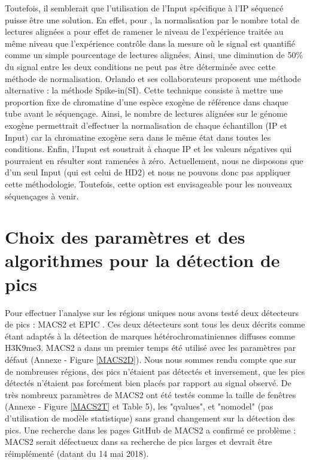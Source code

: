 \documentclass[a4paper,12pt,times]{report}
\begin{document}
  
  \bigskip
  Toutefois, il semblerait que l'utilisation de l'Input spécifique à l'IP séquencé puisse être une solution. En effet, pour \cite{norma}, la normalisation par le nombre total de lectures alignées a pour effet de ramener le niveau de l'expérience traitée au même niveau que l'expérience contrôle dans la mesure où le signal est quantifié comme un simple pourcentage de lectures alignées. Ainsi, une diminution de 50\% du signal entre les deux conditions ne peut pas être déterminée avec cette méthode de normalisation.  
  Orlando et ses collaborateurs proposent une méthode alternative : la méthode Spike-in(SI). Cette technique consiste à mettre une proportion fixe de chromatine d'une espèce exogène de référence dans chaque tube avant le séquençage. Ainsi, le nombre de lectures alignées sur le génome exogène permettrait  d'effectuer la normalisation de chaque échantillon (IP et Input) car la chromatine exogène sera dans le même état dans toutes les conditions. Enfin, l'Input est soustrait à chaque IP et les valeurs négatives qui pourraient en résulter sont ramenées à zéro.  
\newline Actuellement, nous ne disposons que d'un seul Input (qui est celui de HD2) et nous ne pouvons donc pas appliquer cette méthodologie.  Toutefois, cette option est envisageable pour les nouveaux séquençages à venir.
 \section{Choix des paramètres et des algorithmes pour la détection de pics}
 Pour effectuer l'analyse sur les régions uniques nous avons testé deux détecteurs de pics : MACS2 \cite{MACS} et EPIC \cite{SICER}.
 Ces deux détecteurs sont tous les deux décrits comme étant adaptés à la détection de marques hétérochromatiniennes diffuses comme H3K9me3.
\newline
 MACS2 a dans un premier temps été utilisé avec les paramètres par défaut (Annexe - Figure \ref{MACS2D}).  Nous nous sommes rendu compte que sur de nombreuses régions, des pics n'étaient pas détectés et inversement,  que les pics détectés n'étaient pas forcément bien placés par rapport au signal observé.  De très nombreux paramètres de MACS2 ont été testés comme la taille de fenêtres (Annexe - Figure \ref{MACS2T} et Table 5), les "qvalues", et "nomodel" (pas d'utilisation de modèle statistique) sans grand changement sur la détection des pics. Une recherche dans les pages GitHub de MACS2 a confirmé ce problème : MACS2 serait défectueux dans sa recherche de pics larges et devrait être réimplémenté (datant du 14 mai 2018).
\end{document}
